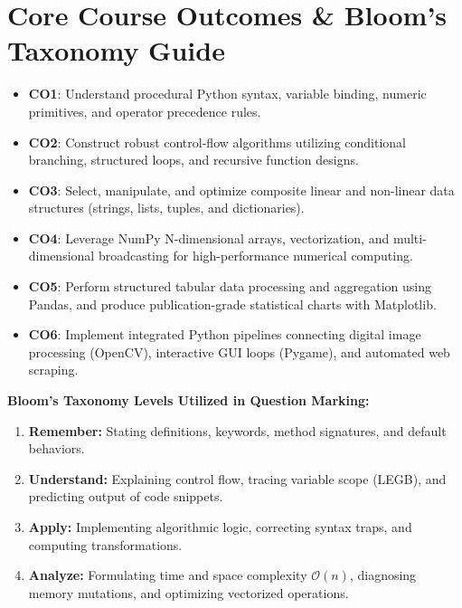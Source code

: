 \chapter*{Core Course Outcomes \& Bloom's Taxonomy Guide}

\begin{itemize}[leftmargin=1.5em, itemsep=4pt]
    \item \textbf{CO1}: Understand procedural Python syntax, variable binding, numeric primitives, and operator precedence rules.
    \item \textbf{CO2}: Construct robust control-flow algorithms utilizing conditional branching, structured loops, and recursive function designs.
    \item \textbf{CO3}: Select, manipulate, and optimize composite linear and non-linear data structures (strings, lists, tuples, and dictionaries).
    \item \textbf{CO4}: Leverage NumPy N-dimensional arrays, vectorization, and multi-dimensional broadcasting for high-performance numerical computing.
    \item \textbf{CO5}: Perform structured tabular data processing and aggregation using Pandas, and produce publication-grade statistical charts with Matplotlib.
    \item \textbf{CO6}: Implement integrated Python pipelines connecting digital image processing (OpenCV), interactive GUI loops (Pygame), and automated web scraping.
\end{itemize}

\vspace{5mm}
\noindent
\textbf{Bloom's Taxonomy Levels Utilized in Question Marking:}
\begin{enumerate}[label=\textbf{L\arabic*:}, leftmargin=1.5em, itemsep=2pt]
    \item \textbf{Remember:} Stating definitions, keywords, method signatures, and default behaviors.
    \item \textbf{Understand:} Explaining control flow, tracing variable scope (LEGB), and predicting output of code snippets.
    \item \textbf{Apply:} Implementing algorithmic logic, correcting syntax traps, and computing transformations.
    \item \textbf{Analyze:} Formulating time and space complexity $\mathcal{O}(n)$, diagnosing memory mutations, and optimizing vectorized operations.
\end{enumerate}

\newpage
